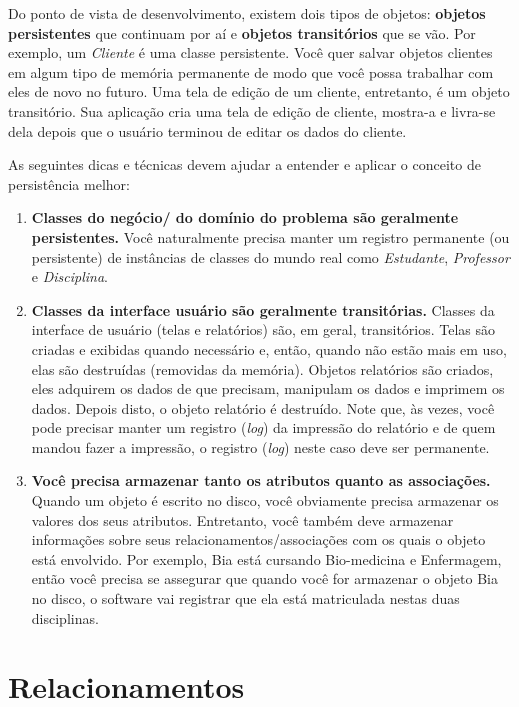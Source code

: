 Do ponto de vista de desenvolvimento, existem dois tipos de objetos: \textbf{objetos persistentes} que continuam por aí e \textbf{objetos transitórios} que se vão. Por exemplo, um \emph{Cliente} é uma classe persistente. Você quer salvar objetos clientes em algum tipo de memória permanente de modo que você possa trabalhar com eles de novo no futuro. Uma tela de edição de um cliente, entretanto, é um objeto transitório. Sua aplicação cria uma tela de edição de cliente, mostra-a e livra-se dela depois que o usuário terminou de editar os dados do cliente.

As seguintes dicas e técnicas devem ajudar a entender e aplicar o conceito de persistência melhor:

\begin{enumerate}
\item \textbf{Classes do negócio/ do domínio do problema são geralmente persistentes.} Você  naturalmente precisa manter um registro permanente (ou persistente) de instâncias de classes do mundo real como \emph{Estudante}, \emph{Professor} e \emph{Disciplina}.

\item \textbf{Classes da interface usuário são geralmente transitórias.} Classes da interface de usuário (telas e relatórios) são, em geral, transitórios. Telas são criadas e exibidas quando necessário e, então, quando não estão mais em uso, elas são destruídas (removidas da memória). Objetos relatórios são criados, eles adquirem os dados de que precisam, manipulam os dados e imprimem os dados. Depois disto, o objeto relatório é destruído. Note que, às vezes, você pode precisar manter um registro (\textit{log}) da impressão do relatório e de quem mandou fazer a impressão, o registro (\textit{log}) neste caso deve ser permanente.

\item \textbf{Você precisa armazenar tanto os atributos quanto as associações.}
Quando um objeto é escrito no disco, você obviamente precisa armazenar os valores dos seus atributos. Entretanto, você também deve armazenar informações sobre seus relacionamentos/associações com os quais o objeto está envolvido. Por exemplo, Bia está cursando Bio-medicina e Enfermagem, então você precisa se assegurar que quando você for armazenar o objeto Bia no disco, o software vai registrar que ela está matriculada nestas duas disciplinas.
\end{enumerate}

\section{Relacionamentos}


